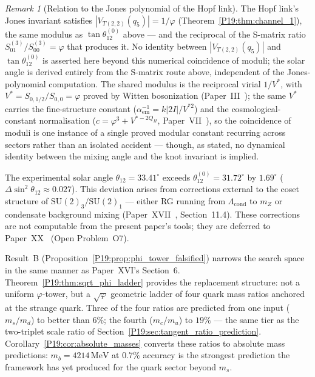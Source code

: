 \documentclass[11pt,a4paper]{article}
\theoremstyle{definition}\newtheorem{definition}[theorem]{Definition}
\theoremstyle{remark}
\newtheorem{remark}[theorem]{Remark}
\newcommand{\vp}{\varphi}
\newcommand{\Jones}{V}
\newcommand{\aem}{\alpha_{\mathrm{em}}}
\begin{document}
\begin{remark}[Relation to the Jones polynomial of the Hopf link]
\label{P19:rem:solar_physical}
The Hopf link's Jones invariant satisfies $|\Jones_{T(2,2)}(q_5)|=1/\vp$
(Theorem~\ref{P19:thm:channel_1}), the same modulus as
$\tan\theta_{12}^{(0)}$ above --- and the reciprocal of the S-matrix
ratio $S_{01}^{(3)}/S_{00}^{(3)}=\vp$ that produces it. No identity
between $|\Jones_{T(2,2)}(q_5)|$ and $\tan\theta_{12}^{(0)}$ is
asserted here beyond this numerical coincidence of moduli; the solar
angle is derived entirely from the S-matrix route above, independent
of the Jones-polynomial computation.  The shared modulus is the
reciprocal virial $1/V^*$, with $V^* = S_{0,1/2}/S_{0,0} = \vp$ proved
by Witten bosonization (Paper~III~\cite{Paper3}); the same $V^*$ carries
the fine-structure constant ($\aem^{-1}=k|2I|/V^{*2}$) and the
cosmological-constant normalisation ($c=\vp^3+V^{*-2Q_H}$,
Paper~VII~\cite{Paper7}), so the coincidence of moduli is one instance
of a single proved modular constant recurring across sectors rather than
an isolated accident --- though, as stated, no dynamical identity between
the mixing angle and the knot invariant is implied.

The experimental solar angle $\theta_{12}=33.41^\circ$ exceeds
$\theta_{12}^{(0)}=31.72^\circ$ by $1.69^\circ$ ($\Delta\sin^2\theta_{12}
\approx 0.027$).  This deviation arises from corrections external
to the coset structure of $\mathrm{SU}(2)_3/\mathrm{SU}(2)_1$ ---
either RG running from $\Lambda_{\mathrm{cond}}$ to $m_Z$ or
condensate background mixing (Paper~XVII~\cite{Paper17},
Section~11.4). %
These corrections are not computable from the present paper's tools;
they are deferred to Paper~XX~\cite{Paper20} (Open Problem~O7).
\end{remark}

Result~B (Proposition~\ref{P19:prop:phi_tower_falsified}) narrows the
search space in the same manner as Paper~XVI's Section~6.
Theorem~\ref{P19:thm:sqrt_phi_ladder} provides the replacement
structure: not a uniform $\vp$-tower, but a $\sqrt{\vp}$ geometric
ladder of four quark mass ratios anchored at the strange quark.
Three of the four ratios are predicted from one input ($m_s/m_d$)
to better than $6\%$; the fourth ($m_c/m_u$) to $19\%$ --- the
same tier as the two-triplet scale ratio of
Section~\ref{P19:sec:tangent_ratio_prediction}.
Corollary~\ref{P19:cor:absolute_masses} converts these ratios to
absolute mass predictions: $m_b=4214\,\mathrm{MeV}$ at $0.7\%$
accuracy is the strongest prediction the framework has yet produced
for the quark sector beyond $m_s$.
\end{document}
